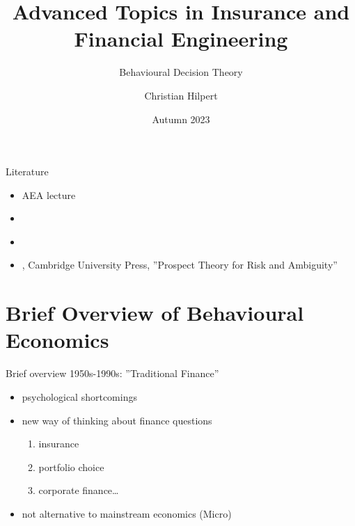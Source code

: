 





\title[Advanced Topics in Insurance and Financial Engineering]{Advanced Topics in Insurance and Financial Engineering}
\subtitle{Behavioural Decision Theory}
\author[Christian Hilpert]{Christian Hilpert}
\date[Autumn 2023]{Autumn 2023}







\begin{frame}{Literature}
    \begin{itemize}
        \item \citet{Barberis2017Talk} AEA lecture\bigskip
        \item \citet{Thaler2016}\bigskip
        \item \citet{Barberis2013a}\bigskip
        \item \citet{Wakker2010}, Cambridge University Press, ''Prospect Theory for Risk and Ambiguity''\bigskip
	\end{itemize}
\end{frame}

\section{Brief Overview of Behavioural Economics}
\begin{frame}{Brief overview}
    1950s-1990s: ''Traditional Finance''\bigskip
\begin{itemize}
	\item psychological shortcomings \bigskip
    \item new way of thinking about finance questions\bigskip
        \begin{enumerate}
            \item insurance\medskip
            \item portfolio choice\medskip
            \item corporate finance\ldots
            \medskip
        \end{enumerate}
    \item not alternative to mainstream economics (Micro)\bigskip
\end{itemize}
\end{frame}

